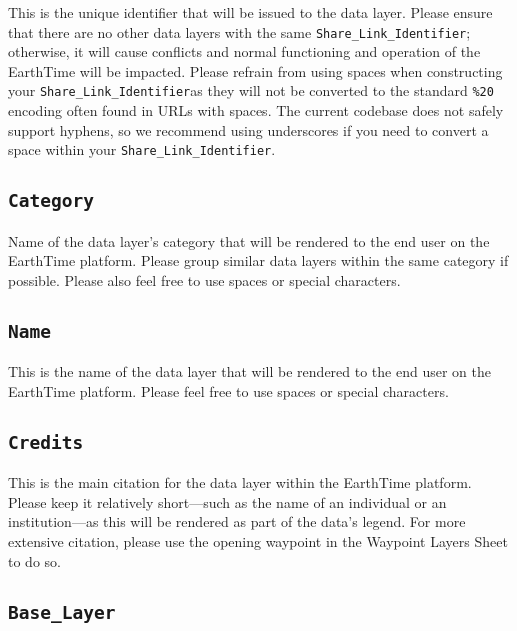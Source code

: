 \documentclass[
]{book}
\begin{document}
This is the unique identifier that will be issued to the data layer. Please ensure that there are no other data layers with the same \texttt{Share\_Link\_Identifier}; otherwise, it will cause conflicts and normal functioning and operation of the EarthTime will be impacted. Please refrain from using spaces when constructing your \texttt{Share\_Link\_Identifier}as they will not be converted to the standard \texttt{\%20} encoding often found in URLs with spaces. The current codebase does not safely support hyphens, so we recommend using underscores if you need to convert a space within your \texttt{Share\_Link\_Identifier}.

\hypertarget{category}{%
\subsection*{\texorpdfstring{\texttt{Category}}{Category}}\label{category}}


Name of the data layer's category that will be rendered to the end user on the EarthTime platform. Please group similar data layers within the same category if possible. Please also feel free to use spaces or special characters.

\hypertarget{name}{%
\subsection*{\texorpdfstring{\texttt{Name}}{Name}}\label{name}}


This is the name of the data layer that will be rendered to the end user on the EarthTime platform. Please feel free to use spaces or special characters.

\hypertarget{credits}{%
\subsection*{\texorpdfstring{\texttt{Credits}}{Credits}}\label{credits}}


This is the main citation for the data layer within the EarthTime platform. Please keep it relatively short---such as the name of an individual or an institution---as this will be rendered as part of the data's legend. For more extensive citation, please use the opening waypoint in the Waypoint Layers Sheet to do so.

\hypertarget{base_layer}{%
\subsection*{\texorpdfstring{\texttt{Base\_Layer}}{Base\_Layer}}\label{base_layer}}
\end{document}
